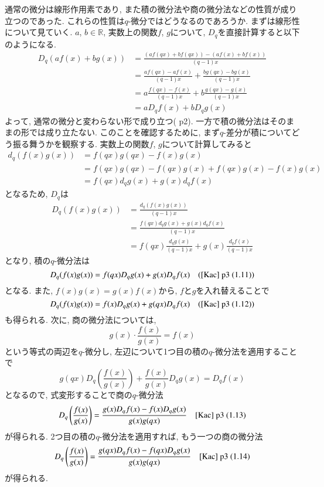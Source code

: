 \documentclass[11pt]{jsreport}
\theoremstyle{mystyle}
\newcommand{\R}{\mathbb{R}}
\newcommand{\0}{\textbf{0}}
\newcommand{\1}{\textbf{1}}
\newcommand{\2}{\textbf{2}}
\begin{document}
通常の微分は線形作用素であり, また積の微分法や商の微分法などの性質が成り立つのであった. これらの性質は$q$-微分ではどうなるのであろうか. まずは線形性について見ていく. $a$, $b \in \R$, 実数上の関数$f$, $g$について, $D_q$を直接計算すると以下のようになる. 
\begin{align*}
  D_q (af(x) + bg(x)) &= \frac{(af(qx) + bf(qx)) - (af(x) + bf(x))}{(q - 1)x}\\
                           &= \frac{af(qx) - af(x)}{(q - 1)x} + \frac{bg(qx) - bg(x)}{(q - 1)x}\\
                           &= a \frac{f(qx) - f(x)}{(q - 1)x} + b \frac{g(qx) - g(x)}{(q - 1)x}\\
                           &= a D_q f(x) + b D_q g(x)
\end{align*}
よって, 通常の微分と変わらない形で成り立つ(\cite{Kac} p2). 一方で積の微分法はそのままの形では成り立たない. このことを確認するために, まず$q$-差分が積についてどう振る舞うかを観察する. 実数上の関数$f$, $g$について計算してみると 
\begin{align*}
  d_q (f(x)g(x)) &= f(qx)g(qx) - f(x)g(x) \\
                    &= f(qx)g(qx) - f(qx)g(x) + f(qx)g(x) - f(x)g(x)\\
                    &= f(qx) d_q g(x) + g(x) d_q f(x)
\end{align*}
となるため, $D_q$は
\begin{align*}
  D_q(f(x)g(x)) &= \frac{d_q(f(x)g(x))}{(q - 1)x}\\
                   &= \frac{f(qx) d_q g(x) + g(x) d_q f(x)}{(q - 1)x}\\
                   &= f(qx) \frac{d_q g(x)}{(q - 1)x} + g(x) \frac{d_q f(x)}{(q - 1)x}
\end{align*}
となり, 積の$q$-微分法は
\[
  D_q (f(x) g(x)) = f(qx) D_q g(x) + g(x) D_q f(x) \quad \text{(\cite{Kac} p3 (1.11))}
\]
となる. また, $f(x)g(x) = g(x)f(x)$から, $f$と$g$を入れ替えることで
\[
  D_q (f(x) g(x)) = f(x) D_q g(x) + g(qx) D_q f(x) \quad \text{(\cite{Kac} p3 (1.12))}
\]
も得られる. 次に, 商の微分法については, 
\[
  g(x) \cdot \frac{f(x)}{g(x)} = f(x)
\]
という等式の両辺を$q$-微分し, 左辺について1つ目の積の$q$-微分法を適用することで
\[
  g(qx) D_q \left( \frac{f(x)}{g(x)} \right) + \frac{f(x)}{g(x)} D_q g(x) = D_qf (x)
\]
となるので, 式変形することで商の$q$-微分法
\[
  D_q \left( \frac{f(x)}{g(x)} \right) = \frac{g(x) D_q f(x) - f(x) D_q g(x)}{g(x) g(qx)}
  \quad \text{\cite{Kac} p3 (1.13)}
\]
が得られる. 2つ目の積の$q$-微分法を適用すれば, もう一つの商の微分法
\[
  D_q \left( \frac{f(x)}{g(x)} \right) = \frac{g(qx) D_q f(x) - f(qx) D_q g(x)}{g(x) g(qx)}
  \quad \text{\cite{Kac} p3 (1.14)}
\]
が得られる. 
\end{document}
